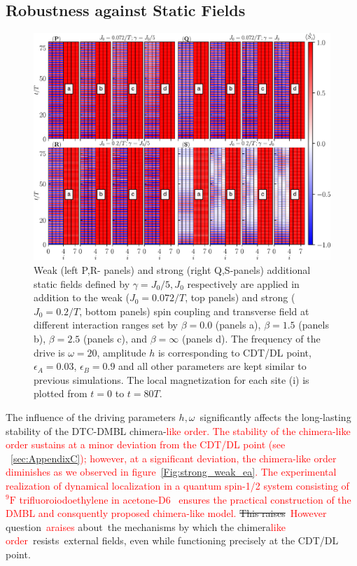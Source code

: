 \documentclass[12pt]{iopart}
\newcommand{\red}[1]{\textcolor{red}{#1}}
\begin{document}
\subsection{\label{sec:level44} Robustness against Static Fields}
\begin{figure}[h!]
	\begin{center}
		\includegraphics[width=13cm]{figure13.pdf}
	\end{center}
	\caption{Weak (left P,R- panels) and strong (right Q,S-panels) additional static fields defined by $\gamma = J_0/5, J_0$ respectively are applied in addition to the weak ($J_0=0.072/T$, top panels) and strong ($J_0=0.2/T$, bottom panels) spin coupling and transverse field at different interaction ranges set by $\beta = 0.0$ (panels a), $\beta= 1.5$ (panels b), $\beta=2.5$ (panels c), and $\beta= \infty$ (panels d). The frequency of the drive is $\omega = 20$, amplitude $h$ is corresponding to CDT/DL point, $\epsilon_A=0.03$, $\epsilon_B=0.9$ and all other parameters are kept similar to previous simulations.  The local magnetization for each site (i) is plotted from $t=0$ to $t=80 T$.}
	\label{Fig:robustness}
\end{figure}
The influence of the driving parameters $h, \omega$ significantly affects the long-lasting stability of the DTC-DMBL chimera-\red{like order. The stability of the chimera-like order sustains at a minor deviation from the CDT/DL point (see ~\ref{sec:AppendixC}); however, at a significant deviation, the chimera-like order diminishes as we observed in figure~\ref{Fig:strong_weak_ea}. The experimental realization of dynamical localization in a quantum spin-1/2 system consisting of $^9\mathrm{F}$ trifluoroiodoethylene in acetone-D6~\cite{Hegde2014} ensures the practical construction of the DMBL and consquently proposed chimera-like model.} \sout{This raises} \red{However} question \red{araises} about the mechanisms by which the chimera\red{like order} resists external fields, even while functioning precisely at the CDT/DL point.
\end{document}
